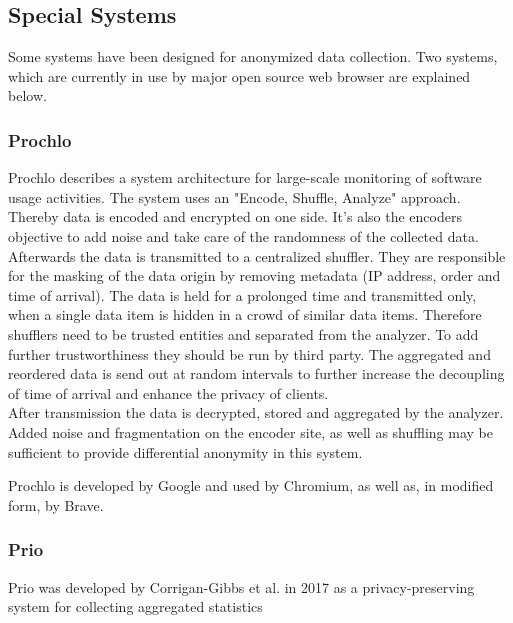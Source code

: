     
\newpage
    
    \subsection{Special Systems}
        \label{subsec:related:special}
        Some systems have been designed for anonymized data collection. 
        Two systems, which are currently in use by major open source web browser are explained below.
         
        
    \subsubsection{Prochlo}
        Prochlo describes a system architecture for large-scale monitoring of software usage activities. The system uses an "Encode, Shuffle, Analyze" approach. Thereby data is encoded and encrypted on one side. It's also the encoders objective to add noise and take care of the randomness of the collected data\cite{bittau_prochlo_2017}.\\
        Afterwards the data is transmitted to a centralized shuffler. They are responsible for the masking of the data origin by removing metadata (IP address, order and time of arrival).
        The data is held for a prolonged time and transmitted only, when a single data item is hidden in a crowd of similar data items. Therefore shufflers need to be trusted entities and separated from the analyzer\cite{bittau_prochlo_2017}. To add further trustworthiness they should be run by third party. The aggregated and reordered data is send out at random intervals to further increase the decoupling of time of arrival and enhance the privacy of clients.\\
        After transmission the data is decrypted, stored and aggregated by the analyzer. 
        Added noise and fragmentation on the encoder site, as well as shuffling may be sufficient to provide differential anonymity in this system.
        
        Prochlo is developed by Google and used by Chromium, as well as, in modified form, by Brave.
    
    \subsubsection{Prio}
        Prio was developed by Corrigan-Gibbs et al.\cite{corrigan-gibbs_prio_2017} in 2017 as a privacy-preserving
        system for collecting aggregated statistics
        
